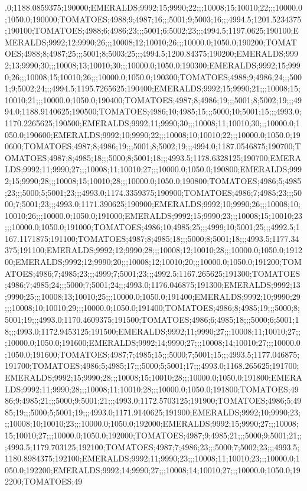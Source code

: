 .0;1188.0859375;190000;EMERALDS;9992;15;9990;22;;;10008;15;10010;22;;;10000.0;1050.0;190000;TOMATOES;4988;9;4987;16;;;5001;9;5003;16;;;4994.5;1201.5234375;190100;TOMATOES;4988;6;4986;23;;;5001;6;5002;23;;;4994.5;1197.0625;190100;EMERALDS;9992;12;9990;26;;;10008;12;10010;26;;;10000.0;1050.0;190200;TOMATOES;4988;8;4987;25;;;5001;8;5003;25;;;4994.5;1200.84375;190200;EMERALDS;9992;13;9990;30;;;10008;13;10010;30;;;10000.0;1050.0;190300;EMERALDS;9992;15;9990;26;;;10008;15;10010;26;;;10000.0;1050.0;190300;TOMATOES;4988;9;4986;24;;;5001;9;5002;24;;;4994.5;1195.7265625;190400;EMERALDS;9992;15;9990;21;;;10008;15;10010;21;;;10000.0;1050.0;190400;TOMATOES;4987;8;4986;19;;;5001;8;5002;19;;;4994.0;1188.9140625;190500;TOMATOES;4986;10;4985;15;;;5000;10;5001;15;;;4993.0;1170.2265625;190500;EMERALDS;9992;11;9990;30;;;10008;11;10010;30;;;10000.0;1050.0;190600;EMERALDS;9992;10;9990;22;;;10008;10;10010;22;;;10000.0;1050.0;190600;TOMATOES;4987;8;4986;19;;;5001;8;5002;19;;;4994.0;1187.0546875;190700;TOMATOES;4987;8;4985;18;;;5000;8;5001;18;;;4993.5;1178.6328125;190700;EMERALDS;9992;11;9990;27;;;10008;11;10010;27;;;10000.0;1050.0;190800;EMERALDS;9992;15;9990;28;;;10008;15;10010;28;;;10000.0;1050.0;190800;TOMATOES;4986;5;4985;23;;;5000;5;5001;23;;;4993.0;1174.3359375;190900;TOMATOES;4986;7;4985;23;;;5000;7;5001;23;;;4993.0;1171.390625;190900;EMERALDS;9992;10;9990;26;;;10008;10;10010;26;;;10000.0;1050.0;191000;EMERALDS;9992;15;9990;23;;;10008;15;10010;23;;;10000.0;1050.0;191000;TOMATOES;4986;10;4985;25;;;4999;10;5001;25;;;4992.5;1167.1171875;191100;TOMATOES;4987;8;4985;18;;;5000;8;5001;18;;;4993.5;1177.34375;191100;EMERALDS;9992;12;9990;28;;;10008;12;10010;28;;;10000.0;1050.0;191200;EMERALDS;9992;12;9990;20;;;10008;12;10010;20;;;10000.0;1050.0;191200;TOMATOES;4986;7;4985;23;;;4999;7;5001;23;;;4992.5;1167.265625;191300;TOMATOES;4986;7;4985;24;;;5000;7;5001;24;;;4993.0;1176.046875;191300;EMERALDS;9992;13;9990;25;;;10008;13;10010;25;;;10000.0;1050.0;191400;EMERALDS;9992;10;9990;29;;;10008;10;10010;29;;;10000.0;1050.0;191400;TOMATOES;4986;8;4985;19;;;5000;8;5001;19;;;4993.0;1170.4609375;191500;TOMATOES;4986;6;4985;18;;;5000;6;5001;18;;;4993.0;1172.9453125;191500;EMERALDS;9992;11;9990;27;;;10008;11;10010;27;;;10000.0;1050.0;191600;EMERALDS;9992;14;9990;27;;;10008;14;10010;27;;;10000.0;1050.0;191600;TOMATOES;4987;7;4985;15;;;5000;7;5001;15;;;4993.5;1177.046875;191700;TOMATOES;4986;5;4985;17;;;5000;5;5001;17;;;4993.0;1168.265625;191700;EMERALDS;9992;15;9990;28;;;10008;15;10010;28;;;10000.0;1050.0;191800;EMERALDS;9992;11;9990;28;;;10008;11;10010;28;;;10000.0;1050.0;191800;TOMATOES;4986;9;4985;21;;;5000;9;5001;21;;;4993.0;1172.5703125;191900;TOMATOES;4986;5;4985;19;;;5000;5;5001;19;;;4993.0;1171.9140625;191900;EMERALDS;9992;10;9990;23;;;10008;10;10010;23;;;10000.0;1050.0;192000;EMERALDS;9992;15;9990;27;;;10008;15;10010;27;;;10000.0;1050.0;192000;TOMATOES;4987;9;4985;21;;;5000;9;5001;21;;;4993.5;1179.703125;192100;TOMATOES;4987;7;4986;23;;;5000;7;5002;23;;;4993.5;1180.8984375;192100;EMERALDS;9992;11;9990;23;;;10008;11;10010;23;;;10000.0;1050.0;192200;EMERALDS;9992;14;9990;27;;;10008;14;10010;27;;;10000.0;1050.0;192200;TOMATOES;49